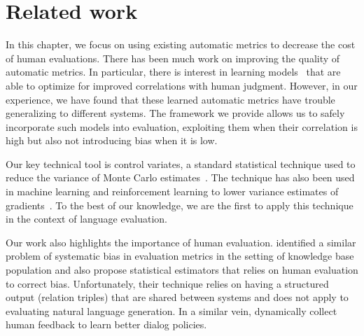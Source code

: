 \section{\label{sec:setup} Related work}

In this chapter, we focus on using existing automatic metrics to decrease the cost of human evaluations.
There has been much work on improving the quality of automatic metrics.
In particular, there is interest in learning models~\citep{lowe2017towards,dusek2017referenceless} that are able to optimize for improved correlations with human judgment.
However, in our experience, we have found that these learned automatic metrics have trouble generalizing to different systems.
The framework we provide allows us to safely incorporate such models into evaluation, exploiting them when their correlation is high but also not introducing bias when it is low.

Our key technical tool is control variates, a standard statistical technique used to reduce the variance of Monte Carlo estimates~\citep{ripley2009stochastic}.
The technique has also been used in machine learning and reinforcement learning to lower variance estimates of gradients~\citep{greensmith2004variance, paisley2012variational, ranganath2014black}.
To the best of our knowledge, we are the first to apply this technique in the context of language evaluation.

Our work also highlights the importance of human evaluation.
\citet{chaganty2017unbiased} identified a similar problem of systematic bias in evaluation metrics in the setting of knowledge base population and also propose statistical estimators that relies on human evaluation to correct bias.
Unfortunately, their technique relies on having a structured output (relation triples) that are shared between systems and does not apply to evaluating natural language generation.
In a similar vein, \citet{chang2017affordable} dynamically collect human feedback to learn better dialog policies.
%



